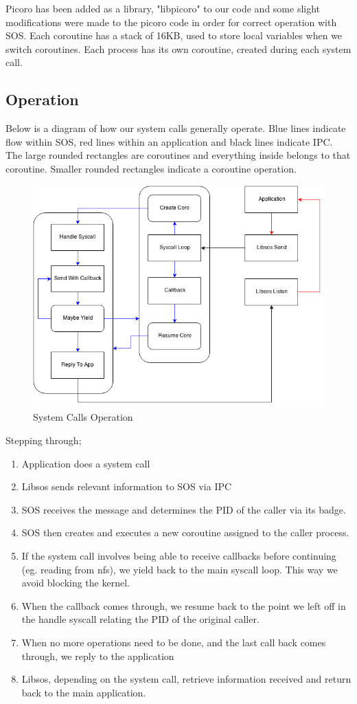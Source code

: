 \documentclass[12pt]{article}
\begin{document}
Picoro has been added as a library, "libpicoro" to our code and some slight modifications were made to the picoro code in order for correct operation with SOS.
Each coroutine has a stack of 16KB, used to store local variables when we switch coroutines.
Each process has its own coroutine, created during each system call.
\clearpage
\subsection{Operation}
Below is a diagram of how our system calls generally operate. Blue lines indicate flow within SOS, red lines within an application and black lines indicate IPC. The large rounded rectangles are coroutines and everything inside belongs to that coroutine. Smaller rounded rectangles indicate a coroutine operation. 
\begin{figure}[htbp]
\centering
\includegraphics[scale=0.6]{System_Calls_Type2}
\caption{System Calls Operation}
\end{figure}

Stepping through;
\begin{enumerate}
\item Application does a system call
\item Libsos sends relevant information to SOS via IPC
\item SOS receives the message and determines the PID of the caller via its badge.
\item SOS then creates and executes a new coroutine assigned to the caller process.
\item If the system call involves being able to receive callbacks before continuing (eg. reading from nfs), we yield back to the main syscall loop. This way we avoid blocking the kernel.
\item When the callback comes through, we resume back to the point we left off in the handle syscall relating the PID of the original caller.
\item When no more operations need to be done, and the last call back comes through, we reply to the application
\item Libsos, depending on the system call, retrieve information received and return back to the main application.

\end{enumerate}
\end{document}
